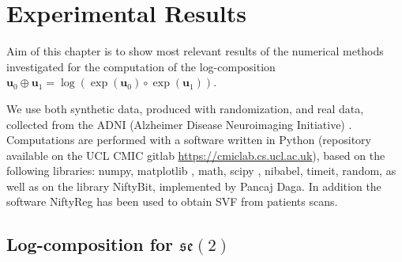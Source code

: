 \chapter{Experimental Results}\label{ch:results}

%


Aim of this chapter is to show most relevant results of the numerical methods investigated for the computation of the log-composition $\mathbf{u}_0\oplus\mathbf{u}_1 = \log(\exp(\mathbf{u}_0)\circ \exp(\mathbf{u}_1))$.

We use both synthetic data, produced with randomization, and real data, collected from the ADNI (Alzheimer Disease Neuroimaging Initiative) \cite{jack2008alzheimer}.
Computations are performed with a software written in Python 
(repository available on the UCL CMIC gitlab \href{https://cmiclab.cs.ucl.ac.uk}{https://cmiclab.cs.ucl.ac.uk}), based on 
the following libraries: numpy, matplotlib \cite{hunter2007}, math, scipy \cite{scipy}, nibabel, timeit, random, as well as on the library NiftyBit, implemented by Pancaj Daga. In addition the software NiftyReg \cite{modat2010fast} has been used to obtain SVF from patients scans. 

\section{Log-composition for $\mathfrak{se}(2)$}

